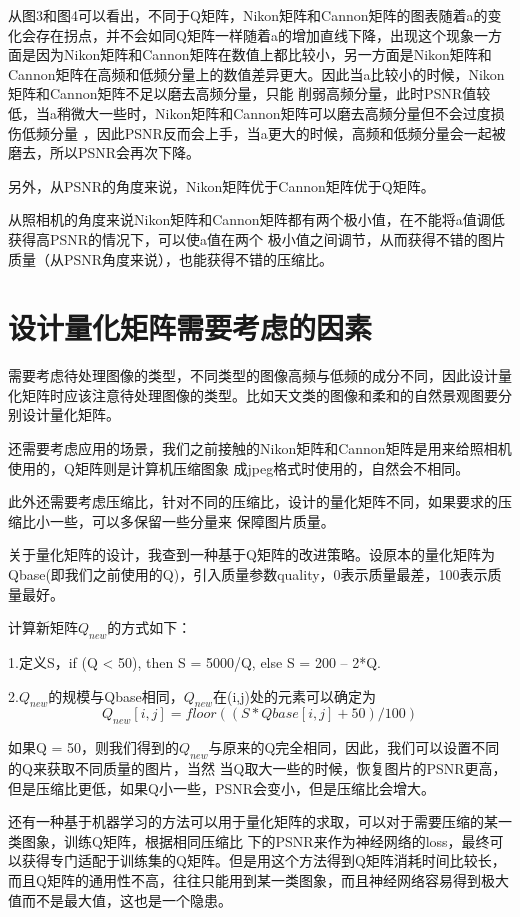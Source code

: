 \documentclass{ctexart}
\begin{document}
从图3和图4可以看出，不同于Q矩阵，Nikon矩阵和Cannon矩阵的图表随着a的变化会存在拐点，并不会如同Q矩阵一样随着a的增加直线下降，出现这个现象一方面是因为Nikon矩阵和Cannon矩阵在数值上都比较小，另一方面是Nikon矩阵和Cannon矩阵在高频和低频分量上的数值差异更大。因此当a比较小的时候，Nikon矩阵和Cannon矩阵不足以磨去高频分量，只能
削弱高频分量，此时PSNR值较低，当a稍微大一些时，Nikon矩阵和Cannon矩阵可以磨去高频分量但不会过度损伤低频分量
，因此PSNR反而会上手，当a更大的时候，高频和低频分量会一起被磨去，所以PSNR会再次下降。

另外，从PSNR的角度来说，Nikon矩阵优于Cannon矩阵优于Q矩阵。

从照相机的角度来说Nikon矩阵和Cannon矩阵都有两个极小值，在不能将a值调低获得高PSNR的情况下，可以使a值在两个
极小值之间调节，从而获得不错的图片质量（从PSNR角度来说），也能获得不错的压缩比。
\section{设计量化矩阵需要考虑的因素}
需要考虑待处理图像的类型，不同类型的图像高频与低频的成分不同，因此设计量化矩阵时应该注意待处理图像的类型。比如天文类的图像和柔和的自然景观图要分别设计量化矩阵。

还需要考虑应用的场景，我们之前接触的Nikon矩阵和Cannon矩阵是用来给照相机使用的，Q矩阵则是计算机压缩图象
成jpeg格式时使用的，自然会不相同。

此外还需要考虑压缩比，针对不同的压缩比，设计的量化矩阵不同，如果要求的压缩比小一些，可以多保留一些分量来
保障图片质量。

关于量化矩阵的设计，我查到一种基于Q矩阵的改进策略。设原本的量化矩阵为Qbase(即我们之前使用的Q)，引入质量参数quality，0表示质量最差，100表示质量最好。

计算新矩阵$Q_{new}$的方式如下：

1.定义S，if (Q < 50), then S = 5000/Q, else S = 200 – 2*Q.

2.$Q_{new}$的规模与Qbase相同，$Q_{new}$在(i,j)处的元素可以确定为
\begin{equation}
Q_{new}[i,j] = floor((S * Qbase[i,j] + 50) / 100)
\end{equation}

如果Q = 50，则我们得到的$Q_{new}$与原来的Q完全相同，因此，我们可以设置不同的Q来获取不同质量的图片，当然
当Q取大一些的时候，恢复图片的PSNR更高，但是压缩比更低，如果Q小一些，PSNR会变小，但是压缩比会增大。

还有一种基于机器学习的方法可以用于量化矩阵的求取，可以对于需要压缩的某一类图象，训练Q矩阵，根据相同压缩比
下的PSNR来作为神经网络的loss，最终可以获得专门适配于训练集的Q矩阵。但是用这个方法得到Q矩阵消耗时间比较长，
而且Q矩阵的通用性不高，往往只能用到某一类图象，而且神经网络容易得到极大值而不是最大值，这也是一个隐患。
\end{document}
